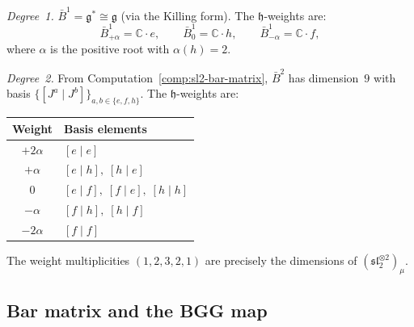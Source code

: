 \begin{computation}
\label{comp:bgg-weight-decomp}

\emph{Degree~1.} $\bar{B}^1 = \mathfrak{g}^* \cong \mathfrak{g}$
(via the Killing form). The $\mathfrak{h}$-weights are:
\begin{equation}\label{eq:degree1-weights}
\bar{B}^1_{+\alpha} = \mathbb{C} \cdot e, \qquad
\bar{B}^1_0 = \mathbb{C} \cdot h, \qquad
\bar{B}^1_{-\alpha} = \mathbb{C} \cdot f,
\end{equation}
where $\alpha$ is the positive root with $\alpha(h) = 2$.

\emph{Degree~2.} From Computation~\ref{comp:sl2-bar-matrix},
$\bar{B}^2$ has dimension~$9$ with basis
$\{[J^a \mid J^b]\}_{a,b \in \{e,f,h\}}$. The
$\mathfrak{h}$-weights are:
\begin{center}
\renewcommand{\arraystretch}{1.2}
\begin{tabular}{cl}
\textbf{Weight} & \textbf{Basis elements} \\
\hline
$+2\alpha$ & $[e \mid e]$ \\
$+\alpha$ & $[e \mid h],\; [h \mid e]$ \\
$0$ & $[e \mid f],\; [f \mid e],\; [h \mid h]$ \\
$-\alpha$ & $[f \mid h],\; [h \mid f]$ \\
$-2\alpha$ & $[f \mid f]$ \\
\end{tabular}
\end{center}
The weight multiplicities $(1, 2, 3, 2, 1)$ are precisely the dimensions
of $(\mathfrak{sl}_2^{\otimes 2})_\mu$.
\end{computation}

\subsection{Bar matrix and the BGG map}

